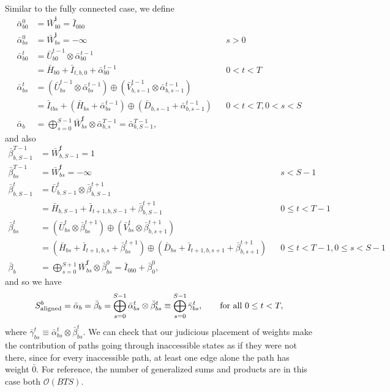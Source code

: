 \documentclass[a4paper]{article}
\begin{document}
Similar to the fully connected case, we define
\begin{align}
\bar\alpha^0_{b0} &= \bar{W}^{\mathbf{i}}_{b0} =\bar{I}_{0b0} \\
\bar\alpha^0_{bs} &= \bar{W}^{\mathbf{i}}_{bs} =-\infty && s>0\\
\bar\alpha^t_{b0} &= \bar{U}^{t-1}_{b0}\otimes\bar\alpha^{t-1}_{b0} 
\\
&=\bar{H}_{b0}+\bar{I}_{t,b,0}+\bar\alpha^{t-1}_{b0} && 0<t<T \\
\bar\alpha^t_{bs} &= (\bar{U}^{t-1}_{bs} \otimes\bar\alpha^{t-1}_{bs})\oplus (\bar{V}^{t-1}_{b,s-1} \otimes\bar\alpha^{t-1}_{b,s-1}) \\
&= \bar{I}_{tbs} + (\bar{H}_{bs} + \bar\alpha^{t-1}_{bs})\oplus (\bar{D}_{b, s-1} + \bar\alpha^{t-1}_{b,s-1}) && 0 < t < T, 0<s<S \\
\bar\alpha_b &= \bigoplus_{s=0}^{S-1} \bar{W}^{\mathbf{f}}_{bs} \otimes \bar\alpha^{T-1}_{b,s} = \bar\alpha^{T-1}_{b,S-1},
\end{align}
and also
\begin{align}
\bar\beta^{T-1}_{b,S-1} &= \bar{W}^{\mathbf{f}}_{b,S-1} =1 \\
\bar\beta^{T-1}_{bs} &= \bar{W}^{\mathbf{f}}_{bs} =-\infty && s<S-1\\
\bar\beta^t_{b,S-1} &= \bar{U}^{t}_{b,S-1}\otimes\bar\beta^{t+1}_{b,S-1} 
\\
&=\bar{H}_{b,S-1}+\bar{I}_{t+1,b,S-1}+\bar\beta^{t+1}_{b,S-1} && 0\leq t<T-1 \\
\bar\beta^t_{bs} &= (\bar{U}^{t}_{bs} \otimes\bar\beta^{t+1}_{bs})\oplus (\bar{V}^{t}_{bs} \otimes\bar\beta^{t+1}_{b,s+1}) \\
&= (\bar{H}_{bs} + \bar{I}_{t+1,b,s} + \bar\beta^{t+1}_{bs})\oplus (\bar{D}_{bs} + \bar{I}_{t+1,b, s+1} + \bar\beta^{t+1}_{b,s+1}) && 0 \leq t < T-1, 0\leq s<S-1 \\
\bar\beta_b &= \bigoplus_{s=0}^{S+1}\bar{W}^{\mathbf{f}}_{bs} \otimes \bar\beta^{0}_{bs} = \bar{I}_{0b0}  + \bar\beta^{0}_{0},
\end{align}
and so we have
\begin{equation}
S^b_{\rm{aligned}} = \bar\alpha_b = \bar\beta_b = \bigoplus_{s=0}^{S-1}\bar\alpha^t_{bs}\otimes \bar\beta^t_{bs}\equiv \bigoplus_{s=0}^{S-1}\bar\gamma^t_{bs},\qquad \textrm{for all } 0 \leq t < T,
\end{equation}
where $\bar\gamma^t_{bs} \equiv \bar\alpha^t_{bs}\otimes \bar\beta^t_{bs}$.
We can check that our judicious placement of weights make the contribution of paths going through inaccessible states as if they were not there, since for every inaccessible path, at least one edge alone the path has weight $\bar{0}$. For reference, the number of generalized sums and products are in this case both $\mathcal{O}(BTS)$.
\end{document}
